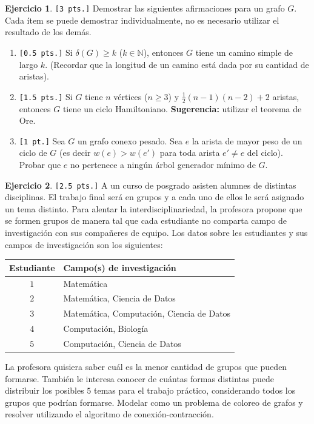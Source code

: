 \documentclass[a4paper,oneside,12pt]{amsart}
\theoremstyle{definition}
\newtheorem{quest}{Ejercicio}
\begin{document}
\begin{quest}\verb|[3 pts.]|  
Demostrar las siguientes afirmaciones para un grafo $G$. Cada ítem se puede demostrar individualmente, no es necesario utilizar el resultado de los demás.
\begin{enumerate}[label=\alph*)]
    \item \verb|[0.5 pts.]| Si $\delta(G)\geq k$ ($k\in\mathbb{N}$), entonces $G$ tiene un camino simple de largo $k$. (Recordar que la longitud de un camino está dada por su cantidad de aristas).
    \item \verb|[1.5 pts.]| Si $G$ tiene $n$ vértices ($n\geq 3$) y $\frac{1}{2}(n-1)(n-2)+2$ aristas, entonces $G$ tiene un ciclo Hamiltoniano. \textbf{Sugerencia:} utilizar el teorema de Ore.
    \item  \verb|[1 pt.]| Sea $G$ un grafo conexo pesado. Sea $e$ la arista de mayor peso de un ciclo de $G$ (es decir $w(e)>w(e')$ para toda arista $e'\neq e$ del ciclo). Probar que $e$ no pertenece a ningún árbol generador mínimo de $G$.
\end{enumerate}

\end{quest}




\begin{quest}\verb|[2.5 pts.]| 
A un curso de posgrado asisten alumnes de distintas disciplinas. El trabajo final será en grupos y a cada uno de ellos le será asignado un tema distinto. Para alentar la interdisciplinariedad, la profesora propone que se formen grupos de manera tal que cada estudiante no comparta campo de investigación con sus compañeres de equipo. Los datos sobre les estudiantes y sus campos de investigación son los siguientes:
\begin{table}[htpb!]
    \centering
    \begin{tabular}{|c|l|}\hline
        Estudiante & Campo(s) de investigación  \\\hline
        $1$ & Matemática \\
        $2$ & Matemática, Ciencia de Datos \\
        $3$ & Matemática, Computación, Ciencia de Datos \\
        $4$ & Computación, Biología \\
        $5$ & Computación, Ciencia de Datos\\\hline
    \end{tabular}
\end{table}

La profesora quisiera saber cuál es la menor cantidad de grupos que pueden formarse. También le interesa conocer de cuántas formas distintas puede distribuir los posibles $5$ temas para el trabajo práctico, considerando todos los grupos que podrían formarse. Modelar como un problema de coloreo de grafos y resolver utilizando el algoritmo de conexión-contracción.
 
\end{quest}
\end{document}

